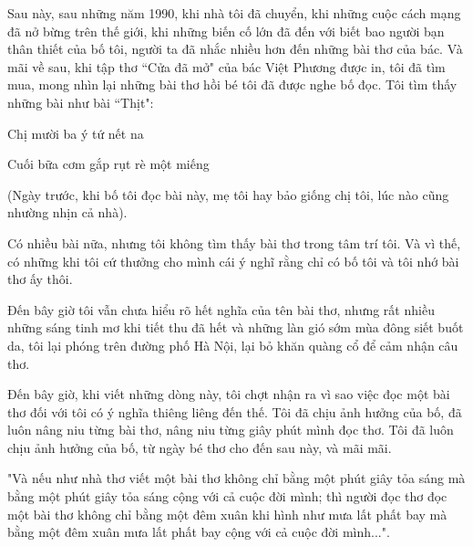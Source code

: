 Sau này, sau những năm 1990, khi nhà tôi đã chuyển, khi những cuộc cách mạng đã nở bừng trên thế giới, khi những biến cố lớn đã đến với biết bao người bạn thân thiết của bố tôi, người ta đã nhắc nhiều hơn đến những bài thơ của bác. Và mãi về sau, khi tập thơ “Cửa đã mở" của bác Việt Phương được in, tôi đã tìm mua, mong nhìn lại những bài thơ hồi bé tôi đã được nghe bố đọc. Tôi tìm thấy những bài như bài “Thịt":

Chị mười ba ý tứ nết na

Cuối bữa cơm gắp rụt rè một miếng

(Ngày trước, khi bố tôi đọc bài này, mẹ tôi hay bảo giống chị tôi, lúc nào cũng nhường nhịn cả nhà).

Có nhiều bài nữa, nhưng tôi không tìm thấy bài thơ trong tâm trí tôi. Và vì thế, có những khi tôi cứ thưởng cho mình cái ý nghĩ rằng chỉ có bố tôi và tôi nhớ bài thơ ấy thôi.

Đến bây giờ tôi vẫn chưa hiểu rõ hết nghĩa của tên bài thơ, nhưng rất nhiều những sáng tinh mơ khi tiết thu đã hết và những làn gió sớm mùa đông siết buốt da, tôi lại phóng trên đường phố Hà Nội, lại bỏ khăn quàng cổ để cảm nhận câu thơ.

Đến bây giờ, khi viết những dòng này, tôi chợt nhận ra vì sao việc đọc một bài thơ đối với tôi có ý nghĩa thiêng liêng đến thế. Tôi đã chịu ảnh hưởng của bố, đã luôn nâng niu từng bài thơ, nâng niu từng giây phút mình đọc thơ. Tôi đã luôn chịu ảnh hưởng của bố, từ ngày bé thơ cho đến sau này, và mãi mãi.

"Và nếu như nhà thơ viết một bài thơ không chỉ bằng một phút giây tỏa sáng mà bằng một phút giây tỏa sáng cộng với cả cuộc đời mình; thì người đọc thơ đọc một bài thơ không chỉ bằng một đêm xuân khi hình như mưa lất phất bay mà bằng một đêm xuân mưa lất phất bay cộng với cả cuộc đời mình...".